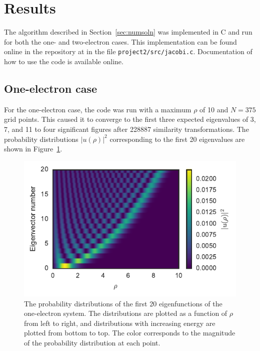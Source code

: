 \documentclass[aps,prc,reprint]{revtex4-1}
\begin{document}
\section{Results}
\label{sec:results}
    The algorithm described in Section~\ref{sec:numsoln} was implemented in C and run for both the one- and two-electron cases. This implementation can be found online in the repository at \cite{github} in the file \texttt{project2/src/jacobi.c}. Documentation of how to use the code is available online.

    \subsection{One-electron case}
    \label{sub:oneelecresults}
        For the one-electron case, the code was run with a maximum $\rho$ of 10 and $N=375$ grid points. This caused it to converge to the first three expected eigenvalues of 3, 7, and 11 to four significant figures after \num{228887} similarity transformations. The probability distributions $|u(\rho)|^2$ corresponding to the first 20 eigenvalues are shown in Figure~\ref{fig:eigvecs}.

        \begin{figure}
            \includegraphics{eigenvecs.pdf}
            \caption{The probability distributions of the first 20 eigenfunctions of the one-electron system. The distributions are plotted as a function of $\rho$ from left to right, and distributions with increasing energy are plotted from bottom to top. The color corresponds to the magnitude of the probability distribution at each point.}
            \label{fig:eigvecs}
        \end{figure}
\end{document}
